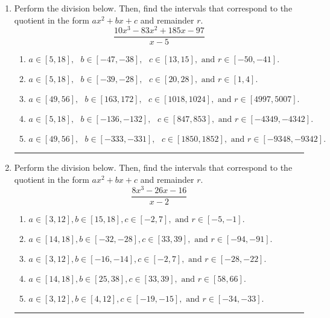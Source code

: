 \documentclass[14pt]{extbook}
\newcommand{\litem}[1]{\item#1\hspace*{-1cm}\rule{\textwidth}{0.4pt}}
\begin{document}
\begin{enumerate}
{\begin{enumerate}[label=\Alph*.]
\end{enumerate} }
\litem{
Perform the division below. Then, find the intervals that correspond to the quotient in the form $ax^2+bx+c$ and remainder $r$.\[ \frac{10x^{3} -83 x^{2} +185 x -97}{x -5} \]\begin{enumerate}[label=\Alph*.]
\item \( a \in [5, 18], \text{   } b \in [-47, -38], \text{   } c \in [13, 15], \text{   and   } r \in [-50, -41]. \)
\item \( a \in [5, 18], \text{   } b \in [-39, -28], \text{   } c \in [20, 28], \text{   and   } r \in [1, 4]. \)
\item \( a \in [49, 56], \text{   } b \in [163, 172], \text{   } c \in [1018, 1024], \text{   and   } r \in [4997, 5007]. \)
\item \( a \in [5, 18], \text{   } b \in [-136, -132], \text{   } c \in [847, 853], \text{   and   } r \in [-4349, -4342]. \)
\item \( a \in [49, 56], \text{   } b \in [-333, -331], \text{   } c \in [1850, 1852], \text{   and   } r \in [-9348, -9342]. \)

\end{enumerate} }
\litem{
Perform the division below. Then, find the intervals that correspond to the quotient in the form $ax^2+bx+c$ and remainder $r$.\[ \frac{8x^{3} -26 x -16}{x -2} \]\begin{enumerate}[label=\Alph*.]
\item \( a \in [3, 12], b \in [15, 18], c \in [-2, 7], \text{ and } r \in [-5, -1]. \)
\item \( a \in [14, 18], b \in [-32, -28], c \in [33, 39], \text{ and } r \in [-94, -91]. \)
\item \( a \in [3, 12], b \in [-16, -14], c \in [-2, 7], \text{ and } r \in [-28, -22]. \)
\item \( a \in [14, 18], b \in [25, 38], c \in [33, 39], \text{ and } r \in [58, 66]. \)
\item \( a \in [3, 12], b \in [4, 12], c \in [-19, -15], \text{ and } r \in [-34, -33]. \)


\end{enumerate}}
\end{enumerate}
\end{document}
